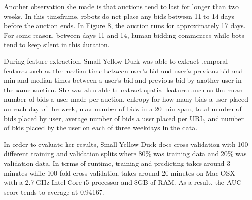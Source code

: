 \documentclass{article} %
\begin{document}
Another observation she made is that auctions tend to last for longer than two weeks.
In this timeframe, robots do not place any bids between 11 to 14 days before the auction ends.
In Figure 8, the auction runs for approximately 17 days. %
For some reason, between days 11 and 14, human bidding commences while bots tend to keep silent in this duration.

\begin{figure}[h]
\centering
{}
\end{figure}

During feature extraction, Small Yellow Duck was able to extract temporal features such as the median time between user's bid and user's previous bid and min and median times between a user's bid and previous bid by another user in the same auction.
She was also able to extract spatial features such as the mean number of bids a user made per auction, entropy for how many bids a user placed on each day of the week, max number of bids in a 20 min span, total number of bids placed by user, average number of bids a user placed per URL, and number of bids placed by the user on each of three weekdays in the data.

In order to evaluate her results, Small Yellow Duck does cross validation with 100 different training and validation splits where 80\% was training data and 20\% was validation data.
In terms of runtime, training and predicting takes around 3 minutes while 100-fold cross-validation takes around 20 minutes on Mac OSX with a 2.7 GHz Intel Core i5 processor and 8GB of RAM.
As a result, the AUC score tends to average at 0.94167. 
\end{document}
